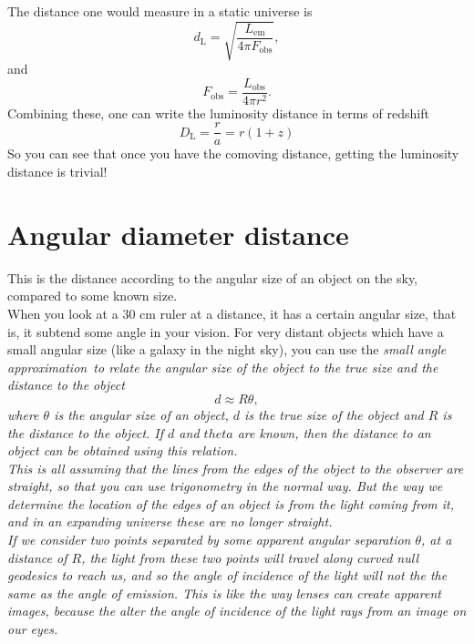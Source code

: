 \documentclass[]{article}
\begin{document}
\noindent The distance one would measure in a static universe is
\begin{equation}
d_\mathrm{L} = \sqrt{\frac{L_\mathrm{em}}{4\pi F_\mathrm{obs}}},
\end{equation}
and 
\begin{equation}
F_\mathrm{obs} = \frac{L_\mathrm{obs}}{4\pi r^2}.
\end{equation}
Combining these, one can write the luminosity distance in terms of redshift
\begin{equation}
D_\mathrm{L} = \frac{r}{a} = r (1+z)
\end{equation}
So you can see that once you have the comoving distance, getting the luminosity distance is trivial!

\section{Angular diameter distance}
This is the distance according to the angular size of an object on the sky, compared to some known size.\\ 

\noindent When you look at a 30 cm ruler at a distance, it has a certain angular size, that is, it subtend some angle in your vision. For very distant objects which have a small angular size (like a galaxy in the night sky), you can use the \itshape small angle approximation~\upshape to relate the angular size of the object to the true size and the distance to the object
\begin{equation}
d \approx R \theta,
\end{equation}
where $\theta$ is the angular size of an object, $d$ is the true size of the object and $R$ is the distance to the object. If $d$ and $theta$ are known, then the distance to an object can be obtained using this relation. \\

\noindent This is all assuming that the lines from the edges of the object to the observer are straight, so that you can use trigonometry in the normal way. But the way we determine the location of the edges of an object is from the light coming from it, and in an expanding universe these are no longer straight. \\

\noindent If we consider two points separated by some apparent angular separation $\theta$, at a distance of $R$, the light from these two points will travel along curved null geodesics to reach us, and so the angle of incidence of the light will not the the same as the angle of emission. This is like the way lenses can create apparent images, because the alter the angle of incidence of the light rays from an image on our eyes. \\
\end{document}
